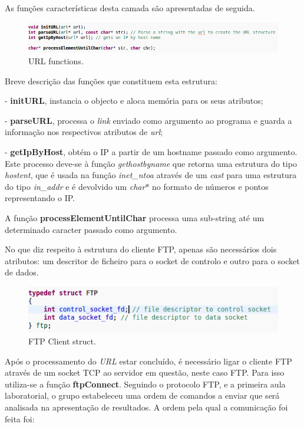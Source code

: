 \documentclass[a4paper]{article}
\begin{document}
As funções características desta camada são apresentadas de seguida.
\pagebreak

\begin{figure}[h!]
\includegraphics[scale=0.5]{res/url-functions.png}
\caption{URL functions.}
\end{figure}

Breve descrição das funções que constituem esta estrutura:

- \textbf{initURL}, instancia o objecto e aloca memória para os seus atributos;

- \textbf{parseURL}, processa o \textit{link} enviado como argumento ao programa e guarda a informação nos respectivos atributos de \textit{url};

- \textbf{getIpByHost}, obtém o IP a partir de um hostname passado como argumento. Este processo deve-se à função \textit{gethostbyname} que retorna uma estrutura do tipo \textit{hostent}, que é usada na função \textit{inet\_ntoa} através de um \textit{cast} para uma estrutura do tipo \textit{in\_addr} e é devolvido um \textit{char$*$} no formato de números e pontos representando o IP.

A função \textbf{processElementUntilChar} processa uma sub-string até um determinado caracter passado como argumento.\linebreak

No que diz respeito à estrutura do cliente FTP, apenas são necessários dois atributos: um descritor de ficheiro para o socket de controlo e outro para o socket de dados.

\begin{figure}[h!]
\includegraphics[scale=0.5]{res/ftp-struct.png}
\caption{FTP Client struct.}
\end{figure}

Após o processamento do \textit{URL} estar concluído, é necessário ligar o cliente FTP através de um socket TCP ao servidor em questão, neste caso FTP. Para isso utiliza-se a função \textbf{ftpConnect}. Seguindo o protocolo FTP, e a primeira aula laboratorial, o grupo estabeleceu uma ordem de comandos a enviar que será analisada na apresentação de resultados. A ordem pela qual a comunicação foi feita foi:
\end{document}
